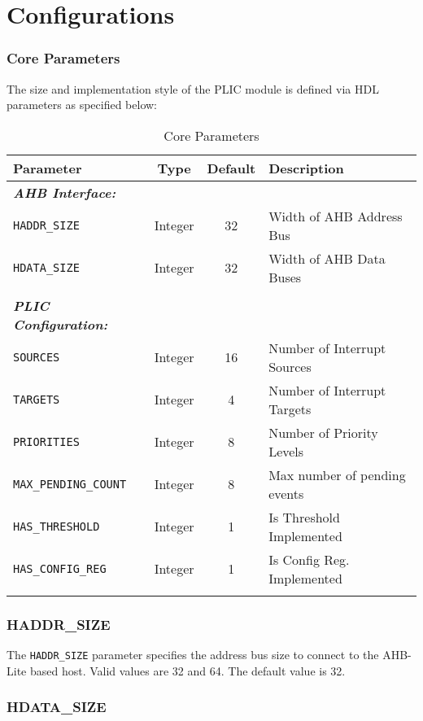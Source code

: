 \chapter{Configurations}

\subsection{Core Parameters}

The size and implementation style of the PLIC module is defined via HDL
parameters as specified below:

\begin{longtable}[c]{@{\extracolsep{\fill}}lccl@{}}	
	\toprule 
	\textbf{Parameter}           & \textbf{Type} & \textbf{Default} & \textbf{Description}\\
	\midrule
	\endhead
	\emph{\textbf{AHB Interface:}}\\
	\texttt{HADDR\_SIZE}         & Integer & 32 & Width of AHB Address Bus\\
	\texttt{HDATA\_SIZE}         & Integer & 32 & Width of AHB Data Buses\\
	& & & \\
	\emph{\textbf{PLIC Configuration:}}\\
	\texttt{SOURCES}             & Integer & 16 & Number of Interrupt Sources\\
	\texttt{TARGETS}             & Integer & 4 & Number of Interrupt Targets\\
	\texttt{PRIORITIES}          & Integer & 8 & Number of Priority Levels\\
	\texttt{MAX\_PENDING\_COUNT} & Integer & 8 & Max number of pending events\\
	\texttt{HAS\_THRESHOLD}      & Integer & 1 & Is Threshold Implemented\\
	\texttt{HAS\_CONFIG\_REG}    & Integer & 1 & Is Config Reg. Implemented\\
	\bottomrule 	
	\caption{Core Parameters}
	\label{tab:CoreParams}
\end{longtable}

\subsection{HADDR\_SIZE}

The \texttt{HADDR\_SIZE} parameter specifies the address bus size to
connect to the AHB-Lite based host. Valid values are 32 and 64. The
default value is 32.

\subsection{HDATA\_SIZE}

